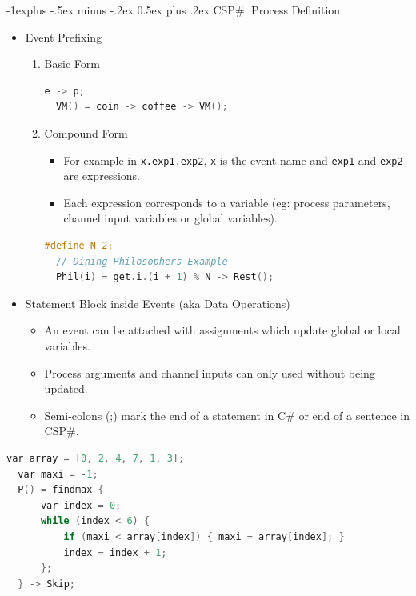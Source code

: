 \documentclass[10pt, landscape]{article}
\makeatletter
\renewcommand{\subsection}{\@startsection{subsection}{2}{0mm}%
  {-1explus -.5ex minus -.2ex}%
  {0.5ex plus .2ex}%
{\normalfont\normalsize\bfseries}}
\makeatother
\begin{document}
\begin{multicols*}{3}
  \subsection{CSP\#: Process Definition}
  \begin{itemize}
  \item Event Prefixing
  \begin{enumerate}
  \item Basic Form
  \begin{lstlisting}[language=C]
  e -> p;
  VM() = coin -> coffee -> VM();
  \end{lstlisting}
  \item Compound Form
  \begin{itemize}
      \item For example in \texttt{x.exp1.exp2}, \texttt{x} is the event name and \texttt{exp1} and \texttt{exp2} are expressions.
      \item Each expression corresponds to a variable (eg: process parameters, channel input variables or global variables).
  \end{itemize}
  \begin{lstlisting}[language=C]
  #define N 2;
  // Dining Philosophers Example
  Phil(i) = get.i.(i + 1) % N -> Rest();
  \end{lstlisting}
  \end{enumerate}
  \end{itemize}
  
  \begin{itemize}
      \item Statement Block inside Events (aka Data Operations)
      \begin{itemize}
          \item An event can be attached with assignments which update global or local variables.
          \item Process arguments and channel inputs can only used without being updated.
          \item Semi-colons (;) mark the end of a statement in C\# or end of a sentence in CSP\#.
      \end{itemize}
  \end{itemize}
  \begin{lstlisting}[language=C]
  var array = [0, 2, 4, 7, 1, 3];
  var maxi = -1;
  P() = findmax {
      var index = 0;
      while (index < 6) {
          if (maxi < array[index]) { maxi = array[index]; }
          index = index + 1;
      };
  } -> Skip;
  \end{lstlisting}


\end{multicols*}
\end{document}
